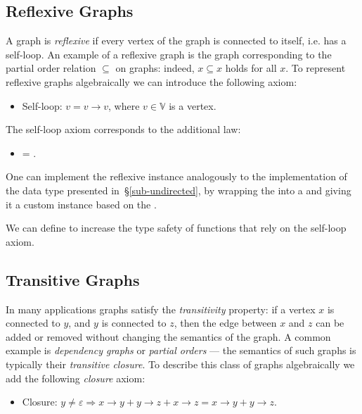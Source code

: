 \subsection{Reflexive Graphs}\label{sub-reflexive}

A graph is \emph{reflexive} if every vertex of the graph is connected to itself,
i.e. has a self-loop. An example of a reflexive graph is the graph corresponding
to the partial order relation $\subseteq$ on graphs: indeed, $x \subseteq x$ holds
for all $x$. To represent reflexive graphs algebraically we can introduce the
following axiom:

\begin{itemize}
    \item Self-loop: $v = v \rightarrow v$, where $v\in \mathbb{V}$ is a vertex.
\end{itemize}

\noindent
The self-loop axiom corresponds to the additional  law:

\begin{itemize}
    \item {} = .
\end{itemize}

One can implement the reflexive  instance analogously to the
implementation of the  data type presented in~\S\ref{sub-undirected},
by wrapping the  into a  and giving it a custom 
instance based on the .

We can define
to increase the type safety of functions that rely on the self-loop axiom.

\subsection{Transitive Graphs}\label{sub-transitive}

In many applications graphs satisfy the \emph{transitivity} property: if a vertex $x$ is
connected to $y$, and $y$ is connected to $z$, then the edge between $x$ and $z$ can be
added or removed without changing the semantics of the graph. A common example is
\emph{dependency graphs} or \emph{partial orders} --- the semantics of such graphs is
typically their \emph{transitive closure}.
To describe this class of graphs algebraically we add the following \emph{closure} axiom:

\begin{itemize}
    \item Closure: $y \neq \varepsilon \Rightarrow x \rightarrow y + y \rightarrow z +
    x \rightarrow z = x \rightarrow y + y \rightarrow z$.
\end{itemize}

